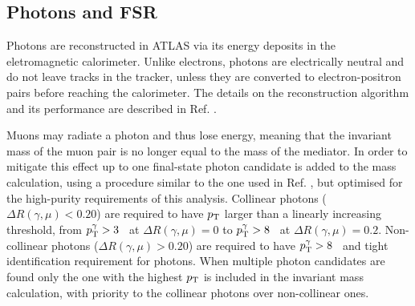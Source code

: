 \subsection{Photons and FSR}

Photons are reconstructed in ATLAS via its energy deposits
in the eletromagnetic calorimeter. Unlike electrons, photons
are electrically neutral and do not leave tracks in the
tracker, unless they are converted to electron-positron
pairs before reaching the calorimeter. The details on the
reconstruction algorithm and its performance are described
in Ref. \cite{Aaboud:2018yqu}.

Muons may radiate a photon and thus lose energy, meaning that
the invariant mass of the muon pair is no longer equal to the
mass of the mediator. In order to mitigate this effect up to
one final-state photon candidate is added to the mass
calculation, using a procedure similar to the one used in
Ref. \cite{Aad:2014eva}, but optimised for the high-purity
requirements of this analysis. Collinear photons
($\Delta R(\gamma, \mu) < 0.20$) are required to have $p_{\text{T}}$
larger than a linearly increasing threshold, from
$p_{\text{T}}^\gamma > 3$ \GeV~at $\Delta R(\gamma, \mu) = 0$ to
$p_{\text{T}}^\gamma > 8$ \GeV~at $\Delta R(\gamma, \mu) = 0.2$.
Non-collinear photons ($\Delta R(\gamma, \mu) > 0.20$)
are required to have $p_{\text{T}}^\gamma > 8$ \GeV~and tight \cite{Aaboud:2018yqu}
identification requirement for photons. When multiple
photon candidates are found only the one with the highest $p_{\text{T}}$
is included in the invariant mass calculation, with priority
to the collinear photons over non-collinear ones.

